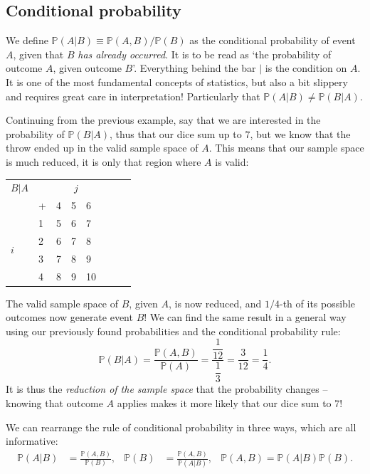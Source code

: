 \documentclass{article}
\begin{document}
\subsection{Conditional probability}
We define $\mathbb{P}(A|B)\equiv\mathbb{P}(A,B)/\mathbb{P}(B)$ as the conditional probability of event $A$, given that $B$ \textit{has already occurred}. It is to be read as `the probability of outcome $A$, given outcome $B$'. Everything behind the bar $|$ is the condition on $A$. It is one of the most fundamental concepts of statistics, but also a bit slippery and requires great care in interpretation! Particularly that $\mathbb{P}(A|B)\neq\mathbb{P}(B|A)$.
\begin{testexample}
    Continuing from the previous example, say that we are interested in the probability of $\mathbb{P}(B|A)$, thus that our dice sum up to $7$, but we know that the throw ended up in the valid sample space of $A$. This means that our sample space is much reduced, it is only that region where $A$ is valid:
    \begin{center}
    \begin{tabular}{@{}ll|llllll}
\toprule
$B|A$ & & \multicolumn{3}{c}{$j$} \\ 
 & + & 4 & 5 & 6 \\ \hline
\multirow{4}{*}{$i$} & 1 & 5 & 6 & \cellcolor{gray!20}7 \\
  & 2 & 6 & \cellcolor{gray!20}7 & 8 \\
  & 3 & \cellcolor{gray!20}7 & 8 & 9 \\
  & 4 & 8 & 9 & 10 \\ \bottomrule
\end{tabular}
\end{center}
The valid sample space of $B$, given $A$, is now reduced, and $1/4$-th of its possible outcomes now generate event $B$! We can find the same result in a general way using our previously found probabilities and the conditional probability rule:
\begin{equation}
    \mathbb{P}(B|A)=\frac{\mathbb{P}(A,B)}{\mathbb{P}(A)}=\frac{\dfrac{1}{12} }{\dfrac{1}{3} }=\frac{3}{12}=\frac{1}{4}.
\end{equation}
It is thus the \textit{reduction of the sample space} that the probability changes -- knowing that outcome $A$ applies makes it more likely that our dice sum to 7!
\end{testexample}
{\flushleft We} can rearrange the rule of conditional probability in three ways, which are all informative:
\begin{align}
    \mathbb{P}(A|B)&=\frac{\mathbb{P}(A,B)}{\mathbb{P}(B)},& \mathbb{P}(B)&=\frac{\mathbb{P}(A,B)}{\mathbb{P}(A|B)},& \mathbb{P}(A,B)=\mathbb{P}(A|B)\mathbb{P}(B).
\end{align}
\end{document}
